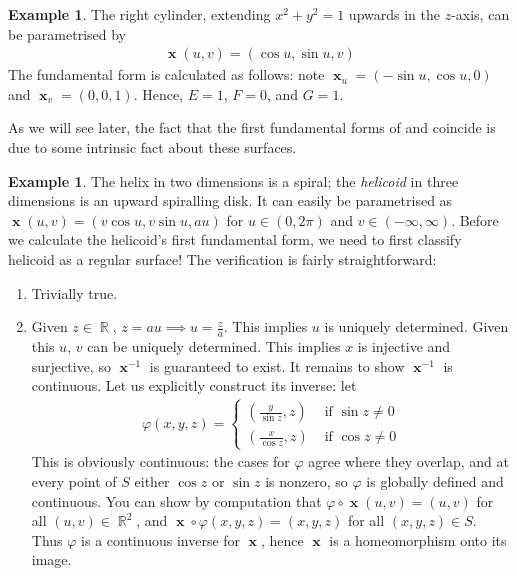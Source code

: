 \documentclass{amsart} %
\theoremstyle{mytheoremstyle}
\theoremstyle{definition}
\newtheorem{example}[definition]{Example}
\numberwithin{equation}{section}
\DeclareMathOperator{\R}{\mathbb{R}}
\DeclareMathOperator{\1}{\mathbbm{1}}
\DeclareMathOperator{\x}{\mathbf{x}}
\renewcommand{\phi}{\varphi}
\renewcommand{\phi}{\varphi}
\begin{document}
\begin{example}
	\label{examplerightcylinder}
	The right cylinder, extending $x^2 + y^2 = 1$ upwards in the $z$-axis, can be parametrised by
	\begin{align*}
	\x(u,v) = (\cos u, \sin u, v)
	\end{align*}
	The fundamental form is calculated as follows: note $\x_u = (-\sin u, \cos u, 0)$ and $\x_v = (0,0,1)$. Hence, $E =1$, $F=0$, and $G=1$.
	
	As we will see later, the fact that the first fundamental forms of  and  coincide is due to some intrinsic fact about these surfaces. 
\end{example}

\begin{example}
	\label{examplehelicoid}
	The helix in two dimensions is a spiral; the \textit{helicoid} in three dimensions is an upward spiralling disk. It can easily be parametrised as $\x(u,v) = (v \cos u, v \sin u, au)$ for $u \in (0,2\pi)$ and $v \in (-\infty,\infty)$. Before we calculate the helicoid's first fundamental form, we need to first classify helicoid as a regular surface! The verification is fairly straightforward:
	\begin{enumerate}
		\item Trivially true.
		\item Given $z \in \R$, $z = au \implies u = \frac{z}{a}$. This implies $u$ is uniquely determined. Given this $u$, $v$ can be uniquely determined. This implies $x$ is injective and surjective, so $\x^{-1}$ is guaranteed to exist. It remains to show $\x^{-1}$ is continuous. Let us explicitly construct its inverse: let
		\begin{align*}
		\phi (x,y,z) = \begin{cases}
		\left( \frac{y}{\sin z} , z \right) & \text{ if } \sin z \neq 0 \\
		\left( \frac{x}{\cos z} , z \right) & \text{ if } \cos z \neq 0
		\end{cases}
		\end{align*}
		This is obviously continuous: the cases for $\phi$ agree where they overlap, and at every point of $S$ either $\cos z$ or $\sin z$ is nonzero, so $\phi$ is globally defined and continuous. You can show by computation that $\phi \circ \x(u,v) = (u,v)$ for all $(u,v)\in \R^2$, and $\x \circ\phi(x,y,z) = (x,y,z)$ for all $(x,y,z)\in S$. Thus $\phi$ is a continuous inverse for $\x$, hence $\x$ is a homeomorphism onto its image.

\end{enumerate}
\end{example}
\end{document}
